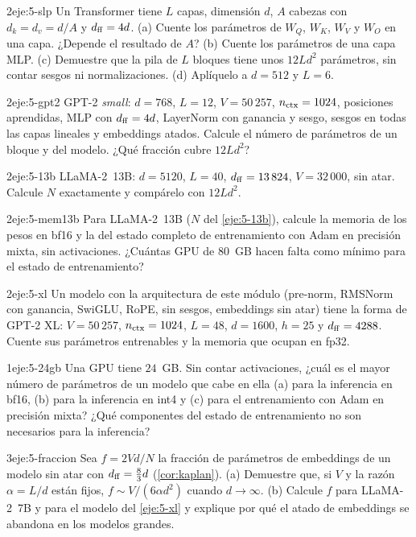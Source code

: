 \begin{ejercicio}{2}{eje:5-slp}
Un Transformer tiene $L$ capas, dimensión $d$, $A$ cabezas con $d_k=d_v=d/A$ y $d_{\mathrm{ff}}=4d$. (a) Cuente los parámetros de $W_Q$, $W_K$, $W_V$ y $W_O$ en una capa. ¿Depende el resultado de $A$? (b) Cuente los parámetros de una capa MLP. (c) Demuestre que la pila de $L$ bloques tiene unos $12Ld^{2}$ parámetros, sin contar sesgos ni normalizaciones. (d) Aplíquelo a $d=512$ y $L=6$.
\end{ejercicio}

\begin{ejercicio}{2}{eje:5-gpt2}
GPT-2 \emph{small}: $d=768$, $L=12$, $V=50\,257$, $n_{\mathrm{ctx}}=1024$, posiciones aprendidas, MLP con $d_{\mathrm{ff}}=4d$, LayerNorm con ganancia y sesgo, sesgos en todas las capas lineales y embeddings atados. Calcule el número de parámetros de un bloque y del modelo. ¿Qué fracción cubre $12Ld^{2}$?
\end{ejercicio}

\begin{ejercicio}{2}{eje:5-13b}
LLaMA-2~13B: $d=5120$, $L=40$, $d_{\mathrm{ff}}=13\,824$, $V=32\,000$, sin atar. Calcule $N$ exactamente y compárelo con $12Ld^{2}$.
\end{ejercicio}

\begin{ejercicio}{2}{eje:5-mem13b}
Para LLaMA-2~13B ($N$ del \cref{eje:5-13b}), calcule la memoria de los pesos en bf16 y la del estado completo de entrenamiento con Adam en precisión mixta, sin activaciones. ¿Cuántas GPU de $80$~GB hacen falta como mínimo para el estado de entrenamiento?
\end{ejercicio}

\begin{ejercicio}{2}{eje:5-xl}
Un modelo con la arquitectura de este módulo (pre-norm, RMSNorm con ganancia, SwiGLU, RoPE, sin sesgos, embeddings sin atar) tiene la forma de GPT-2 XL: $V=50\,257$, $n_{\mathrm{ctx}}=1024$, $L=48$, $d=1600$, $h=25$ y $d_{\mathrm{ff}}=4288$. Cuente sus parámetros entrenables y la memoria que ocupan en fp32.
\end{ejercicio}

\begin{ejercicio}{1}{eje:5-24gb}
Una GPU tiene $24$~GB. Sin contar activaciones, ¿cuál es el mayor número de parámetros de un modelo que cabe en ella (a) para la inferencia en bf16, (b) para la inferencia en int4 y (c) para el entrenamiento con Adam en precisión mixta? ¿Qué componentes del estado de entrenamiento no son necesarios para la inferencia?
\end{ejercicio}

\begin{ejercicio}{3}{eje:5-fraccion}
Sea $f=2Vd/N$ la fracción de parámetros de embeddings de un modelo sin atar con $d_{\mathrm{ff}}=\frac83 d$ (\cref{cor:kaplan}). (a) Demuestre que, si $V$ y la razón $\alpha=L/d$ están fijos, $f\sim V/(6\alpha d^{2})$ cuando $d\to\infty$. (b) Calcule $f$ para LLaMA-2~7B y para el modelo del \cref{eje:5-xl} y explique por qué el atado de embeddings se abandona en los modelos grandes.
\end{ejercicio}
